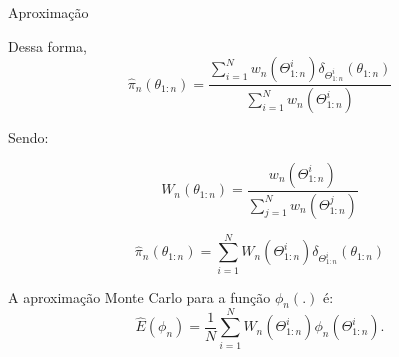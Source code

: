 \documentclass{beamer}
\begin{document}
%
%
%
%
%
%
%
%
%
%
%
%
%
%
%
%
%
%
%
%
%
%
%
%
%
%
%
%
%
%
%
%
%
%


\begin{frame}{Aproximação}

Dessa forma,
$$\hat{\pi}_n(\theta_{1:n})= \frac{\sum^N_{i=1} w_n(\Theta^i_{1:n})\delta_{\Theta^i_{1:n}}(\theta_{1:n})}{\sum^N_{i=1} w_n(\Theta^i_{1:n})} $$

\pause

Sendo:

$$W_n(\theta_{1:n})= \frac{ w_n(\Theta^i_{1:n})}{ \sum^N_{j=1} w_n(\Theta^j_{1:n})} $$

\pause

$$\hat{\pi}_n(\theta_{1:n})= \sum^N_{i=1} W_n(\Theta^i_{1:n})\delta_{\Theta^i_{1:n}}(\theta_{1:n}) $$

\pause
A aproximação Monte Carlo para a função $\phi_n(.)$ é:
$$
\hat{E}(\phi_n) = \frac{1}{N} \sum_{i=1}^N W_n(\Theta^i_{1:n}) \phi_n(\Theta^i_{1:n}).
$$

\end{frame}
\end{document}
